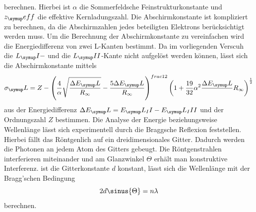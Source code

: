 berechnen. Hierbei ist $\alpha$ die Sommerfeldsche Feinstrukturkonstante und
$z_\su{eff}$ die effektive Kernladungszahl.
Die Abschirmkonstante ist kompliziert zu berechnen, da die Abschirmzahlen
jedes beteiligten Elektrons berücksichtigt werden muss. Um die Berechnung der
Abschirmkonstante zu vereinfachen wird die Energiedifferenz von zwei L-Kanten
bestimmt.
Da im vorliegenden Verscuh die $L_\su{I}-$ und die $L_\su{II}$-Kante nicht
aufgelöst werden können, lässt sich die Abschirmkonstante mittels
\begin{equation}
  \sigma_\su{L}=Z-\left(\frac{4}{\alpha}\sqrt{\frac{\Delta E_\su{L}}{R_\infty}
  }-\frac{5\Delta E_\su{L}}{R_\infty}\right)^{frac{1}{2}}\left(1+\frac{19}{32}
  \alpha^2\frac{\Delta E_\su{L}}{}R_\infty\right)^{\frac{1}{2}}
  \label{abschirm}
\end{equation}
aus der Energiedifferenz $\Delta E_\su{L}=E_\su{L_II}-E_\su{L_III}$ und der
Ordnungszahl $Z$ bestimmen. Die Analyse der Energie beziehungsweise Wellenlänge
lässt sich experimentell durch die Braggsche Reflexion feststellen. Hierbei
fällt das Röntgenlich auf ein dreidimensionales Gitter. Dadurch werden die
Photonen an jedem Atom des Gitters gebeugt. Die Röntgenstrahlen interferieren
miteinander und am Glanzwinkel $\Theta$ erhält man konstruktive Interferenz.
ist die Gitterkonstante $d$ konstant, lässt sich die Wellenlänge mit der
Bragg'schen Bedingung
\begin{equation}
  2d\sinus{\Theta}=n\lambda
  \label{bragg}
\end{equation}
berechnen.
